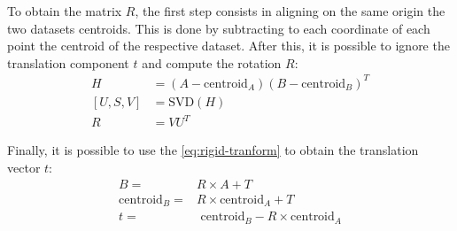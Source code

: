 To obtain the matrix $R$, the first step consists in aligning on the same origin the two datasets centroids. This is done by subtracting to each coordinate of each point the centroid of the respective dataset. After this, it is possible to ignore the translation component $t$ and compute the rotation $R$:
\begin{equation}
    \begin{aligned}
        H         & = (A-\textrm{centroid}_A)(B-\textrm{centroid}_B)^T \\
        [U, S, V] & = \textrm{SVD}(H)                                          \\
        R         & = VU^T
    \end{aligned}
    \label{eq:rotation-matrix}
\end{equation}

Finally, it is possible to use the \cref{eq:rigid-tranform} to obtain the translation vector $t$:
\begin{equation}
    \begin{aligned}
        B =                   & R\times A + T                                     \\
        \textrm{centroid}_B = & R\times \textrm{centroid}_A + T                   \\
        t =                   & \textrm{ centroid}_B - R\times \textrm{centroid}_A
    \end{aligned}
    \label{eq:translation-vector}
\end{equation}
